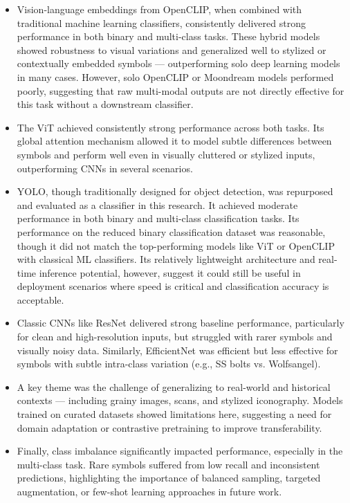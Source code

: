 \begin{itemize}
    \item Vision-language embeddings from OpenCLIP, when combined with traditional machine learning classifiers,
    consistently delivered strong performance in both binary and multi-class tasks. These hybrid models showed
    robustness to visual variations and generalized well to stylized or contextually embedded symbols —
    outperforming solo deep learning models in many cases. However, solo OpenCLIP or Moondream models performed
    poorly, suggesting that raw multi-modal outputs are not directly effective for this task without a downstream
    classifier.
    \item The \ac{ViT} achieved consistently strong performance across both tasks. Its global
    attention mechanism allowed it to model subtle differences between symbols and perform well even in visually
    cluttered or stylized inputs, outperforming CNNs in several scenarios.
    \item YOLO, though traditionally designed for object detection, was repurposed and evaluated as a classifier
    in this research. It achieved moderate performance in both binary and multi-class classification tasks. Its
    performance on the reduced binary classification dataset was reasonable, though it did not match the
    top-performing models like \ac{ViT} or OpenCLIP with classical ML classifiers. Its relatively
    lightweight architecture and real-time inference potential, however, suggest it could still be useful in
    deployment scenarios where speed is critical and classification accuracy is acceptable.
    \item Classic CNNs like ResNet delivered strong baseline performance, particularly for clean and
    high-resolution inputs, but struggled with rarer symbols and visually noisy data. Similarly, EfficientNet was
    efficient but less effective for symbols with subtle intra-class variation (e.g., SS bolts vs. Wolfsangel).
    \item A key theme was the challenge of generalizing to real-world and historical contexts — including grainy
    images, scans, and stylized iconography. Models trained on curated datasets showed limitations here, suggesting
    a need for domain adaptation or contrastive pretraining to improve transferability.
    \item Finally, class imbalance significantly impacted performance, especially in the multi-class task. Rare
    symbols suffered from low recall and inconsistent predictions, highlighting the importance of balanced sampling,
    targeted augmentation, or few-shot learning approaches in future work.
\end{itemize}

